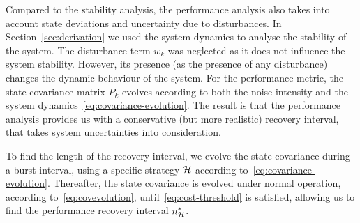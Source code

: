 Compared to the stability analysis, the performance analysis also
takes into account state deviations and uncertainty due to disturbances. In
Section~\ref{sec:derivation} we used the system dynamics to
analyse the stability of the system. The disturbance term $w_k$
was neglected as it does not influence the system
stability. However, its presence (as the presence of any
disturbance) changes the dynamic behaviour of the system. For the
performance metric, the state covariance matrix $P_k$ evolves according
to both the noise intensity and the system
dynamics~\eqref{eq:covariance-evolution}. The result is that the
performance analysis provides us with a conservative (but more
realistic) recovery interval, that takes system uncertainties into
consideration.

To find the length of the recovery interval, we evolve the state 
covariance during a burst interval, using a specific strategy 
$\mathcal{H}$ according to~\eqref{eq:covariance-evolution}. 
Thereafter, the state covariance is evolved under normal operation, 
according to~\eqref{eq:covevolution}, until~\eqref{eq:cost-threshold} 
is satisfied, allowing us to find the performance recovery interval 
$n^*_{\mathcal{H}}$.